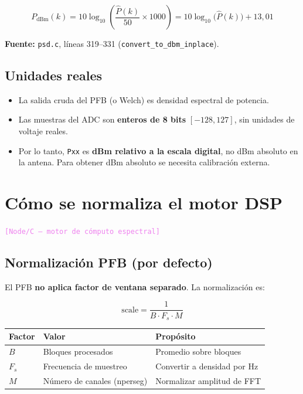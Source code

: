 \documentclass[11pt,a4paper]{article}
\newcommand{\where}[1]{\textcolor{violet}{\texttt{[#1]}}}
\begin{document}
\begin{equation}
P_{\text{dBm}}(k) = 10 \log_{10}\!\left(\frac{\hat{P}(k)}{50} \times 1000\right) = 10 \log_{10}\!\big(\hat{P}(k)\big) + 13{,}01
\label{eq:dbm}
\end{equation}

\textbf{Fuente:} \texttt{psd.c}, líneas 319--331 (\texttt{convert\_to\_dbm\_inplace}).

\subsection{Unidades reales}

\begin{itemize}
\item La salida cruda del PFB (o Welch) es densidad espectral de potencia.
\item Las muestras del ADC son \textbf{enteros de 8 bits} $[-128, 127]$, sin unidades de voltaje reales.
\item Por lo tanto, \texttt{Pxx} es \textbf{dBm relativo a la escala digital}, no dBm absoluto en la antena. Para obtener dBm absoluto se necesita calibración externa.
\end{itemize}

\section{Cómo se normaliza el motor DSP}
\label{sec:normalization}

\where{Node/C — motor de cómputo espectral}

\subsection{Normalización PFB (por defecto)}

El PFB \textbf{no aplica factor de ventana separado}. La normalización es:

\begin{equation}
\text{scale} = \frac{1}{B \cdot F_s \cdot M}
\label{eq:pfb_norm}
\end{equation}

\begin{center}
\begin{tabular}{lll}
\toprule
\textbf{Factor} & \textbf{Valor} & \textbf{Propósito} \\
\midrule
$B$ & Bloques procesados & Promedio sobre bloques \\
$F_s$ & Frecuencia de muestreo & Convertir a densidad por Hz \\
$M$ & Número de canales (nperseg) & Normalizar amplitud de FFT \\
\bottomrule
\end{tabular}
\end{center}
\end{document}
